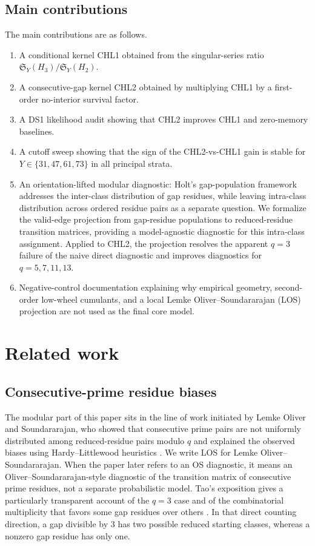 \documentclass[10pt]{article}
\newcommand{\SY}{\mathfrak{S}_Y}
\begin{document}
\subsection{Main contributions}
The main contributions are as follows.
\begin{enumerate}
\item A conditional kernel CHL1 obtained from the singular-series ratio $\SY(H_3)/\SY(H_2)$.
\item A consecutive-gap kernel CHL2 obtained by multiplying CHL1 by a first-order no-interior survival factor.
\item A DS1 likelihood audit showing that CHL2 improves CHL1 and zero-memory baselines.
\item A cutoff sweep showing that the sign of the CHL2-vs-CHL1 gain is stable for $Y\in\{31,47,61,73\}$ in all principal strata.
\item An orientation-lifted modular diagnostic: Holt's gap-population framework addresses the inter-class distribution of gap residues, while leaving intra-class distribution across ordered residue pairs as a separate question.  We formalize the valid-edge projection from gap-residue populations to reduced-residue transition matrices, providing a model-agnostic diagnostic for this intra-class assignment.  Applied to CHL2, the projection resolves the apparent $q=3$ failure of the naive direct diagnostic and improves diagnostics for $q=5,7,11,13$.
\item Negative-control documentation explaining why empirical geometry, second-order low-wheel cumulants, and a local Lemke Oliver--Soundararajan (LOS) projection are not used as the final core model.
\end{enumerate}


\section{Related work}
\subsection{Consecutive-prime residue biases}
The modular part of this paper sits in the line of work initiated by Lemke Oliver and Soundararajan, who showed that consecutive prime pairs are not uniformly distributed among reduced-residue pairs modulo $q$ and explained the observed biases using Hardy--Littlewood heuristics \cite{lemke-sound}.  We write LOS for Lemke Oliver--Soundararajan.  When the paper later refers to an OS diagnostic, it means an Oliver--Soundararajan-style diagnostic of the transition matrix of consecutive prime residues, not a separate probabilistic model.  Tao's exposition gives a particularly transparent account of the $q=3$ case and of the combinatorial multiplicity that favors some gap residues over others \cite{tao2016biases}.  In that direct counting direction, a gap divisible by $3$ has two possible reduced starting classes, whereas a nonzero gap residue has only one.
\end{document}
